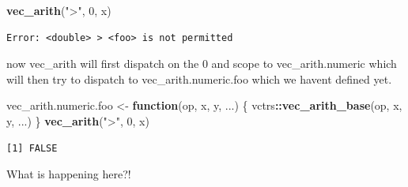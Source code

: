\documentclass[]{book}
\newenvironment{Shaded}{\begin{snugshade}}{\end{snugshade}}
\newcommand{\ControlFlowTok}[1]{\textcolor[rgb]{0.13,0.29,0.53}{\textbf{#1}}}
\newcommand{\DecValTok}[1]{\textcolor[rgb]{0.00,0.00,0.81}{#1}}
\newcommand{\KeywordTok}[1]{\textcolor[rgb]{0.13,0.29,0.53}{\textbf{#1}}}
\newcommand{\NormalTok}[1]{#1}
\newcommand{\OperatorTok}[1]{\textcolor[rgb]{0.81,0.36,0.00}{\textbf{#1}}}
\newcommand{\StringTok}[1]{\textcolor[rgb]{0.31,0.60,0.02}{#1}}
\begin{document}
\begin{Shaded}
\begin{Highlighting}[]
\KeywordTok{vec_arith}\NormalTok{(}\StringTok{">"}\NormalTok{, }\DecValTok{0}\NormalTok{, x)}
\end{Highlighting}
\end{Shaded}

\begin{verbatim}
Error: <double> > <foo> is not permitted
\end{verbatim}

now vec\_arith will first dispatch on the 0 and scope to vec\_arith.numeric which will then try to dispatch to vec\_arith.numeric.foo which we havent defined yet.

\begin{Shaded}
\begin{Highlighting}[]
\NormalTok{vec_arith.numeric.foo <-}\StringTok{ }\ControlFlowTok{function}\NormalTok{(op, x, y, ...) \{}
\NormalTok{  vctrs}\OperatorTok{::}\KeywordTok{vec_arith_base}\NormalTok{(op, x, y, ...) }
\NormalTok{\}}
\KeywordTok{vec_arith}\NormalTok{(}\StringTok{">"}\NormalTok{, }\DecValTok{0}\NormalTok{, x)}
\end{Highlighting}
\end{Shaded}

\begin{verbatim}
[1] FALSE
\end{verbatim}

What is happening here?!
\end{document}
